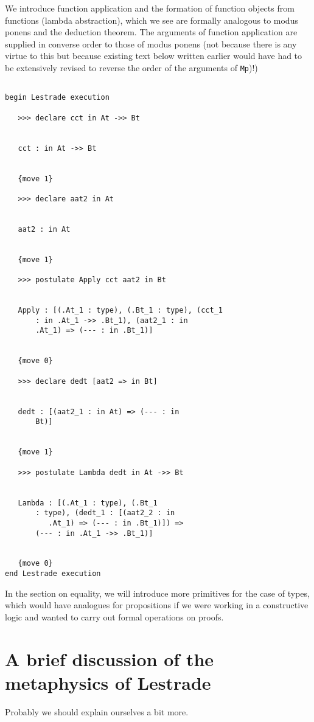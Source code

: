 \documentclass[12pt]{article}
\begin{document}
We introduce function application and the formation of function objects from functions (lambda abstraction), which we see are formally analogous to modus ponens and the deduction theorem.  The arguments of function application are supplied in converse order to those of modus ponens (not because there is any virtue to this but because existing text below written earlier would have had to be extensively revised to reverse the order of the arguments of {\tt Mp})!)

\begin{verbatim}

begin Lestrade execution

   >>> declare cct in At ->> Bt


   cct : in At ->> Bt


   {move 1}

   >>> declare aat2 in At


   aat2 : in At


   {move 1}

   >>> postulate Apply cct aat2 in Bt


   Apply : [(.At_1 : type), (.Bt_1 : type), (cct_1 
       : in .At_1 ->> .Bt_1), (aat2_1 : in 
       .At_1) => (--- : in .Bt_1)]


   {move 0}

   >>> declare dedt [aat2 => in Bt]


   dedt : [(aat2_1 : in At) => (--- : in 
       Bt)]


   {move 1}

   >>> postulate Lambda dedt in At ->> Bt


   Lambda : [(.At_1 : type), (.Bt_1 
       : type), (dedt_1 : [(aat2_2 : in 
          .At_1) => (--- : in .Bt_1)]) => 
       (--- : in .At_1 ->> .Bt_1)]


   {move 0}
end Lestrade execution
\end{verbatim}

In the section on equality, we will introduce more primitives for the case of types, which would have analogues for propositions if we were working in a constructive logic and wanted to carry out formal operations on proofs.

\newpage

\section{A brief discussion of the metaphysics of Lestrade}

Probably we should explain ourselves a bit more.
\end{document}
